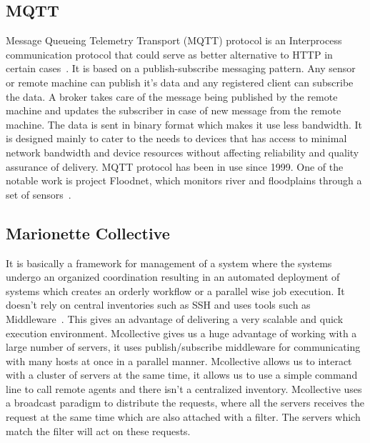 \pv 

\subsection{MQTT}
     
Message Queueing Telemetry Transport (MQTT) protocol is an
Interprocess communication protocol that could serve as better
alternative to HTTP in certain cases~\cite{www-mqtt}. It is based on a
publish-subscribe messaging pattern. Any sensor or remote machine can
publish it's data and any registered client can subscribe the data. A
broker takes care of the message being published by the remote machine
and updates the subscriber in case of new message from the remote
machine. The data is sent in binary format which makes it use less
bandwidth. It is designed mainly to cater to the needs to devices that
has access to minimal network bandwidth and device resources without
affecting reliability and quality assurance of delivery. MQTT protocol
has been in use since 1999. One of the notable work is project
Floodnet, which monitors river and floodplains through a set of
sensors~\cite{www-floodnet}.

     \pv

\subsection{Marionette Collective}

It is basically a framework for management of a system where the
systems undergo an organized coordination resulting in an automated
deployment of systems which creates an orderly workflow or a parallel
wise job execution. It doesn’t rely on central inventories such as SSH
and uses tools such as Middleware~\cite{www-marionette-webpage}. This
gives an advantage of delivering a very scalable and quick execution
environment.  Mcollective gives us a huge advantage of working with a
large number of servers, it uses publish/subscribe middleware for
communicating with many hosts at once in a parallel
manner. Mcollective allows us to interact with a cluster of servers at
the same time, it allows us to use a simple command line to call
remote agents and there isn’t a centralized inventory. Mcollective
uses a broadcast paradigm to distribute the requests, where all the
servers receives the request at the same time which are also attached
with a filter. The servers which match the filter will act on these
requests.

     \pv
     
